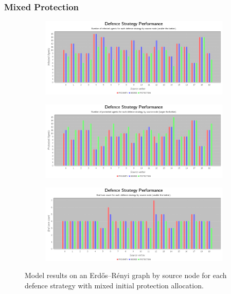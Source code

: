 \documentclass[results.tex]{subfiles}
\begin{document}
\newpage


\subsubsection{Mixed Protection}



\newpage

\begin{figure}[!ht]
\centering
     \begin{subfigure}[b]{0.9\textwidth}
         \centering
         \includegraphics[width=\textwidth]{ErdosRenyi/Mixed/MixedInfectedChart}
         \label{fig:er-mix-infected}
     \end{subfigure}
     \vfill
     \begin{subfigure}[b]{0.9\textwidth}
         \centering
         \includegraphics[width=\textwidth]{ErdosRenyi/Mixed/MixedProtectedChart}
         \label{fig:er-mix-protected}
     \end{subfigure}
     \vfill
     \begin{subfigure}[b]{0.9\textwidth}
         \centering
         \includegraphics[width=\textwidth]{ErdosRenyi/Mixed/MixedEndTurnChart}
         \label{fig:er-mix-end}
     \end{subfigure}
        \caption{Model results on an Erdős–Rényi graph by source node for each defence strategy with mixed initial protection allocation.}
        \label{fig:er-mix-charts}
\end{figure}
\end{document}
